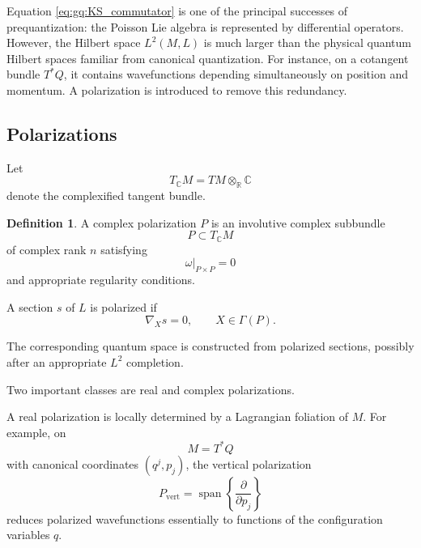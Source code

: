 \documentclass[a4paper,11pt]{article}
\theoremstyle{definition}
\newtheorem{definition}{Definition}[section]
\begin{document}
Equation \eqref{eq:gq:KS_commutator} is one of the principal successes of
prequantization: the Poisson Lie algebra is represented by differential
operators.  However, the Hilbert space
$L^2(M,L)$ is much larger than the physical quantum Hilbert spaces familiar
from canonical quantization.  For instance, on a cotangent bundle
$T^*Q$, it contains wavefunctions depending simultaneously on position and
momentum.  A polarization is introduced to remove this redundancy.

\subsection{Polarizations}
\label{app:gq:polarizations}

Let
\begin{equation}
    T_\mathbb C M
    =
    TM\otimes_\mathbb R\mathbb C
\end{equation}
denote the complexified tangent bundle.

\begin{definition}
A complex polarization $P$ is an involutive complex subbundle
\begin{equation}
    P\subset T_\mathbb C M
\end{equation}
of complex rank $n$ satisfying
\begin{equation}
    \omega|_{P\times P}=0
\end{equation}
and appropriate regularity conditions.
\end{definition}

A section $s$ of $L$ is polarized if
\begin{equation}
    \nabla_Xs=0,
    \qquad
    X\in\Gamma(P).
    \label{eq:gq:polarized_section}
\end{equation}

The corresponding quantum space is constructed from polarized sections,
possibly after an appropriate $L^2$ completion.

Two important classes are real and complex polarizations.

A real polarization is locally determined by a Lagrangian foliation of $M$.
For example, on
\begin{equation}
    M=T^*Q
\end{equation}
with canonical coordinates $(q^j,p_j)$, the vertical polarization
\begin{equation}
    P_{\mathrm{vert}}
    =
    \operatorname{span}
    \left\{
       \frac{\partial}{\partial p_j}
    \right\}
\end{equation}
reduces polarized wavefunctions essentially to functions of the configuration
variables $q$.
\end{document}
